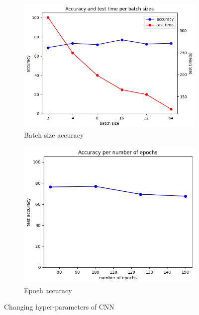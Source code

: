 \begin{figure}[htbp]
\begin{subfigure}{0.23\linewidth}
		\centering
		\includegraphics[width=\linewidth]{image/q4-7-batch.png}
		\caption{Batch size accuracy}
		\label{fig:q4-7-batch}
	\end{subfigure}
	\hfill
	\begin{subfigure}{0.23\linewidth}
		\centering
		\includegraphics[width=\linewidth]{image/q4-7-epoch.png}
		\caption{Epoch accuracy}
		\label{fig:q4-7-epoch}
	\end{subfigure}
	\caption{Changing hyper-parameters of CNN}
	\label{fig:q2}
\end{figure}

